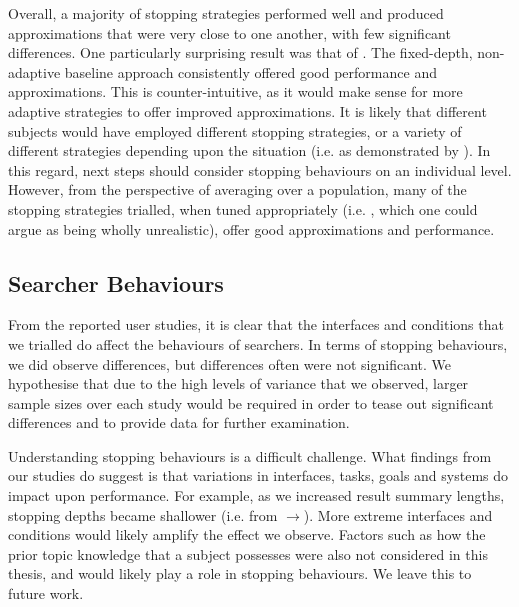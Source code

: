 Overall, a majority of stopping strategies performed well and produced approximations that were very close to one another, with few significant differences. One particularly surprising result was that of . The fixed-depth, non-adaptive baseline approach consistently offered good performance and approximations. This is counter-intuitive, as it would make sense for more adaptive strategies to offer improved approximations. It is likely that different subjects would have employed different stopping strategies, or a variety of different strategies depending upon the situation (i.e. as demonstrated by ). In this regard, next steps should consider stopping behaviours on an individual level. However, from the perspective of averaging over a population, many of the stopping strategies trialled, when tuned appropriately (i.e. , which one could argue as being wholly unrealistic), offer good approximations and performance.

\subsection{Searcher Behaviours}\label{sec:conclusions:discussion:behaviours}
From the reported user studies, it is clear that the interfaces and conditions that we trialled do affect the behaviours of searchers. In terms of stopping behaviours, we did observe differences, but differences often were not significant. We hypothesise that due to the high levels of variance that we observed, larger sample sizes over each study would be required in order to tease out significant differences and to provide data for further examination.

Understanding stopping behaviours is a difficult challenge. What findings from our studies do suggest is that variations in interfaces, tasks, goals and systems do impact upon performance. For example, as we increased result summary lengths, stopping depths became shallower (i.e. from $\rightarrow$). More extreme interfaces and conditions would likely amplify the effect we observe. Factors such as how the prior topic knowledge that a subject possesses were also not considered in this thesis, and would likely play a role in stopping behaviours. We leave this to future work.

